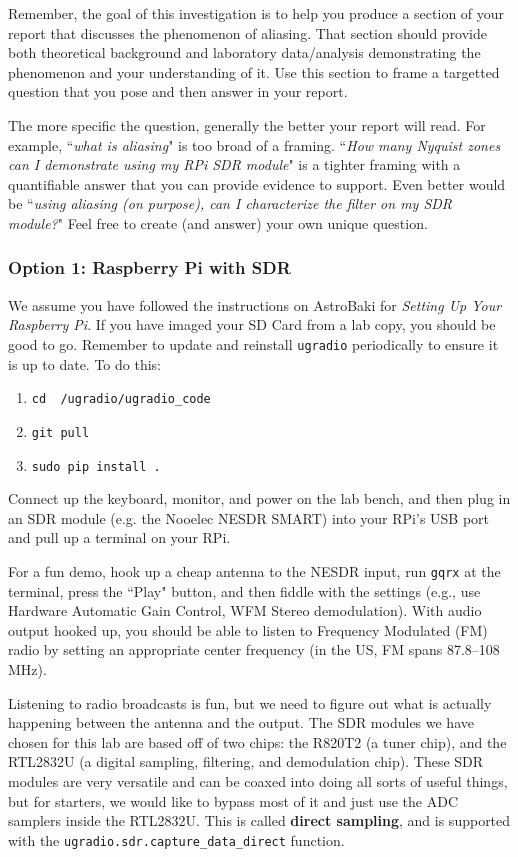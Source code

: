 \documentclass[11pt,preprint]{aastex}
\begin{document}
Remember, the goal of this investigation is to help you produce a section of your report
that discusses the phenomenon of aliasing. That section should provide both
theoretical background and laboratory data/analysis demonstrating the
phenomenon and your understanding of it. Use this section to frame
a targetted question that you pose and then answer in your report.

The more specific the
question, generally the better your report will read. For example, ``{\it what
is aliasing}" is too broad of a framing. ``{\it How many Nyquist zones
can I demonstrate using my RPi SDR module}" is a tighter framing with
a quantifiable answer that you can provide evidence to support. Even better
would be ``{\it using aliasing (on purpose), can I characterize
the filter on my SDR module?}" Feel free to create (and answer) your own unique question.

\subsubsection{Option 1: Raspberry Pi with SDR}

\noindent
We assume you have followed the instructions on AstroBaki for 
{\it Setting Up Your Raspberry Pi}. If you have imaged your SD Card from a lab copy, you
should be good to go. Remember to update and reinstall {\tt ugradio} periodically 
to ensure it is up to date. To do this:
\begin{enumerate}
\item {\tt cd ~/ugradio/ugradio\_code}
\item {\tt git pull}
\item {\tt sudo pip install .}
\end{enumerate}
Connect up the keyboard, monitor, and power on the lab
bench, and then plug in an SDR module 
(e.g. the Nooelec NESDR SMART) into your RPi's USB port and pull up a terminal on
your RPi.

For a fun demo, hook up a cheap antenna to the NESDR input,
run {\tt gqrx} at the terminal, press the ``Play" button, and then fiddle with the
settings (e.g., use Hardware Automatic Gain Control, WFM Stereo demodulation). 
With audio output hooked up, 
you should be able to listen to Frequency Modulated (FM) 
radio by setting an appropriate center frequency (in the US, FM spans
87.8--108 MHz).

Listening to radio broadcasts is fun, but we need to figure out
what is actually happening between the antenna and the output.
The SDR modules we have chosen for this
lab are based off of two chips: the R820T2 (a tuner chip), and the RTL2832U (a digital
sampling, filtering, and demodulation chip).
These SDR modules are very versatile and can be coaxed into doing all sorts of
useful things, but for starters, we would like to bypass most of it
and just use the ADC samplers
inside the RTL2832U. This is called {\bf direct sampling}, and is supported
with the {\tt ugradio.sdr.capture\_data\_direct} function.
\end{document}
